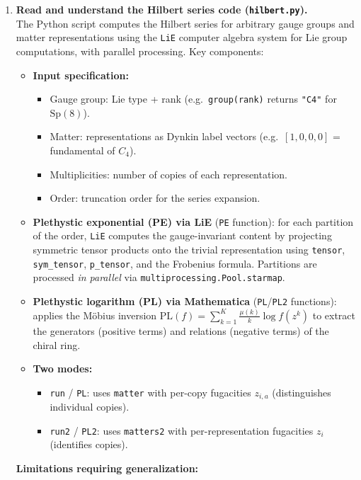 \documentclass[12pt]{article}
\begin{document}
\begin{enumerate}[label=\textbf{0.\arabic*}]
\item \textbf{Read and understand the Hilbert series code (\texttt{hilbert.py}).} \\
  The Python script computes the Hilbert series for arbitrary gauge groups and matter representations
  using the \texttt{LiE} computer algebra system for Lie group computations, with parallel processing.
  Key components:
  \begin{itemize}
    \item \textbf{Input specification:}
    \begin{itemize}
      \item Gauge group: Lie type + rank (e.g.\ \texttt{group(rank)} returns \texttt{"C4"} for $\mathrm{Sp}(8)$).
      \item Matter: representations as Dynkin label vectors (e.g.\ $[1,0,0,0]$ = fundamental of $C_4$).
      \item Multiplicities: number of copies of each representation.
      \item Order: truncation order for the series expansion.
    \end{itemize}
    \item \textbf{Plethystic exponential (PE) via LiE} (\texttt{PE} function):
    for each partition of the order, \texttt{LiE} computes the gauge-invariant content
    by projecting symmetric tensor products onto the trivial representation using \texttt{tensor}, \texttt{sym\_tensor}, \texttt{p\_tensor}, and the Frobenius formula.
    Partitions are processed \emph{in parallel} via \texttt{multiprocessing.Pool.starmap}.
    \item \textbf{Plethystic logarithm (PL) via Mathematica} (\texttt{PL}/\texttt{PL2} functions):
    applies the M\"obius inversion $\mathrm{PL}(f) = \sum_{k=1}^{K} \frac{\mu(k)}{k}\log f(z^k)$
    to extract the generators (positive terms) and relations (negative terms) of the chiral ring.
    \item \textbf{Two modes:}
    \begin{itemize}
      \item \texttt{run} / \texttt{PL}: uses \texttt{matter} with per-copy fugacities $z_{i,a}$ (distinguishes individual copies).
      \item \texttt{run2} / \texttt{PL2}: uses \texttt{matters2} with per-representation fugacities $z_i$ (identifies copies).
    \end{itemize}
  \end{itemize}
  \textbf{Limitations requiring generalization:}
  \begin{itemize}

\end{itemize}
\end{enumerate}
\end{document}
